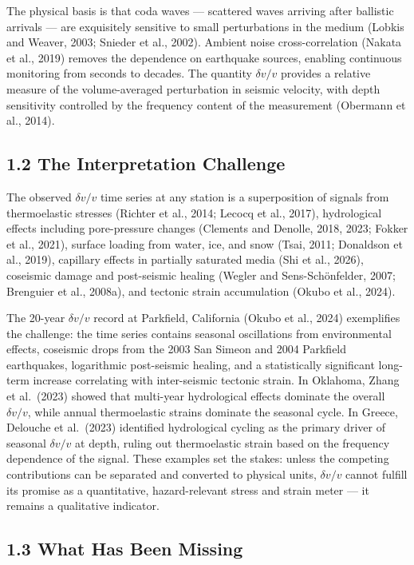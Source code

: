 \documentclass[draft]{agujournal2019}
\begin{document}
The physical basis is that coda waves --- scattered waves arriving after
ballistic arrivals --- are exquisitely sensitive to small perturbations
in the medium (Lobkis and Weaver, 2003; Snieder et al., 2002). Ambient
noise cross-correlation (Nakata et al., 2019) removes the dependence on
earthquake sources, enabling continuous monitoring from seconds to
decades. The quantity \(\delta v/v\) provides a relative measure of the
volume-averaged perturbation in seismic velocity, with depth sensitivity
controlled by the frequency content of the measurement (Obermann et al.,
2014).

\subsection{1.2 The Interpretation
Challenge}\label{the-interpretation-challenge}

The observed \(\delta v/v\) time series at any station is a
superposition of signals from thermoelastic stresses (Richter et al.,
2014; Lecocq et al., 2017), hydrological effects including pore-pressure
changes (Clements and Denolle, 2018, 2023; Fokker et al., 2021), surface
loading from water, ice, and snow (Tsai, 2011; Donaldson et al., 2019),
capillary effects in partially saturated media (Shi et al., 2026),
coseismic damage and post-seismic healing (Wegler and Sens-Schönfelder,
2007; Brenguier et al., 2008a), and tectonic strain accumulation (Okubo
et al., 2024).

The 20-year \(\delta v/v\) record at Parkfield, California (Okubo et
al., 2024) exemplifies the challenge: the time series contains seasonal
oscillations from environmental effects, coseismic drops from the 2003
San Simeon and 2004 Parkfield earthquakes, logarithmic post-seismic
healing, and a statistically significant long-term increase correlating
with inter-seismic tectonic strain. In Oklahoma, Zhang et al.~(2023)
showed that multi-year hydrological effects dominate the overall
\(\delta v/v\), while annual thermoelastic strains dominate the seasonal
cycle. In Greece, Delouche et al.~(2023) identified hydrological cycling
as the primary driver of seasonal \(\delta v/v\) at depth, ruling out
thermoelastic strain based on the frequency dependence of the signal.
These examples set the stakes: unless the competing contributions can be
separated and converted to physical units, \(\delta v/v\) cannot fulfill
its promise as a quantitative, hazard-relevant stress and strain meter
--- it remains a qualitative indicator.

\subsection{1.3 What Has Been Missing}\label{what-has-been-missing}
\end{document}
